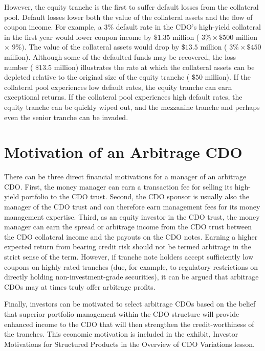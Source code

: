 \documentclass[11pt]{article}
\begin{document}
However, the equity tranche is the first to suffer default losses from the collateral pool. Default losses lower both the value of the collateral assets and the flow of coupon income. For example, a 3\% default rate in the CDO's high-yield collateral in the first year would lower coupon income by $\$ 1.35$ million ( $3 \% \times \$ 500$ million $\times$ $9 \%)$. The value of the collateral assets would drop by $\$ 13.5$ million ( $3 \% \times \$ 450$ million). Although some of the defaulted funds may be recovered, the loss number ( $\$ 13.5$ million) illustrates the rate at which the collateral assets can be depleted relative to the original size of the equity tranche ( $\$ 50$ million). If the collateral pool experiences low default rates, the equity tranche can earn exceptional returns. If the collateral pool experiences high default rates, the equity tranche can be quickly wiped out, and the mezzanine tranche and perhaps even the senior tranche can be invaded.

\section*{Motivation of an Arbitrage CDO}
There can be three direct financial motivations for a manager of an arbitrage CDO. First, the money manager can earn a transaction fee for selling its high-yield portfolio to the CDO trust. Second, the CDO sponsor is usually also the manager of the CDO trust and can therefore earn management fees for its money management expertise. Third, as an equity investor in the CDO trust, the money manager can earn the spread or arbitrage income from the CDO trust between the CDO collateral income and the payouts on the CDO notes. Earning a higher expected return from bearing credit risk should not be termed arbitrage in the strict sense of the term. However, if tranche note holders accept sufficiently low coupons on highly rated tranches (due, for example, to regulatory restrictions on directly holding non-investment-grade securities), it can be argued that arbitrage CDOs may at times truly offer arbitrage profits.

Finally, investors can be motivated to select arbitrage CDOs based on the belief that superior portfolio management within the CDO structure will provide enhanced income to the CDO that will then strengthen the credit-worthiness of the tranches. This economic motivation is included in the exhibit, Investor Motivations for Structured Products in the Overview of CDO Variations lesson.
\end{document}
